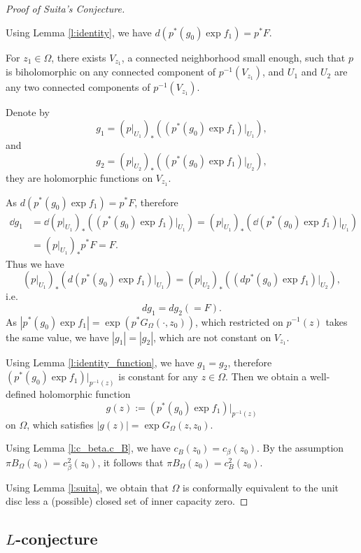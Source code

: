 \begin{proof}[Proof of Suita's Conjecture]
\begin{remark}
\end{remark}
Using Lemma \ref{l:identity}, we have $d(p^{*}(g_{0})\exp
f_{1})=p^{*}F$.

For $z_{1}\in\Omega$,
there exists $V_{z_{1}}$, a connected neighborhood small enough,
such that $p$ is biholomorphic on any connected
component of $p^{-1}(V_{z_{1}})$,
and $U_{1}$ and $U_{2}$ are any two connected components of $p^{-1}(V_{z_{1}})$.

Denote by
$$g_{1}=(p|_{U_{1}})_{*}((p^{*}(g_{0})\exp f_{1})|_{U_{1}}),$$
and
$$g_{2}=(p|_{U_{2}})_{*}((p^{*}(g_{0})\exp f_{1})|_{U_{2}}),$$
they are holomorphic functions on $V_{z_1}$.

As $d(p^{*}(g_{0})\exp f_{1})=p^{*}F$,
therefore
\begin{align*}
  \dd g_1&=\dd (p|_{U_{1}})_{*}((p^{*}(g_{0})\exp f_{1})|_{U_{1}})=(p|_{U_{1}})_{*}(\dd (p^{*}(g_{0})\exp f_{1})|_{U_{1}})\\ 
&=(p|_{U_{1}})_{*} p^* F=F.
\end{align*}
  Thus we have
$$(p|_{U_{1}})_{*}(d(p^{*}(g_{0})\exp f_{1})|_{U_{1}})=(p|_{U_{2}})_{*}((dp^{*}(g_{0})\exp f_{1})|_{U_{2}}),$$
i.e.
$$dg_{1}=dg_{2}(=F).$$
As $|p^{*}(g_{0})\exp f_{1}|=\exp (p^{*}G_{\Omega}(\cdot,z_{0}))$,
which restricted on ${p^{-1}(z)}$ takes the same value,
we have $|g_{1}|=|g_{2}|$, which are not constant on $V_{z_1}$.

Using Lemma \ref{l:identity_function}, we have $g_{1}=g_{2}$,
therefore $(p^{*}(g_{0})\exp f_{1})|_{p^{-1}(z)}$ is constant for
any $z\in\Omega$. Then we obtain a well-defined holomorphic function
$$g(z):=(p^{*}(g_{0})\exp f_{1})|_{p^{-1}(z)}$$
on $\Omega$,
which satisfies $|g(z)|=\exp G_{\Omega}(z,z_{0})$.

Using Lemma \ref{l:c_beta.c_B}, we have
$c_{B}(z_{0})=c_{\beta}(z_{0})$. By the assumption $\pi
B_{\Omega}(z_{0})= c^{2}_{\beta}(z_{0})$, it follows that $\pi
B_{\Omega}(z_{0})=c^{2}_{B}(z_{0})$.

Using Lemma \ref{l:suita}, we obtain that $\Omega$ is conformally
equivalent to the unit disc less a (possible) closed set of inner
capacity zero.


\end{proof}
  
\subsection{\texorpdfstring{$L$}{}-conjecture}

